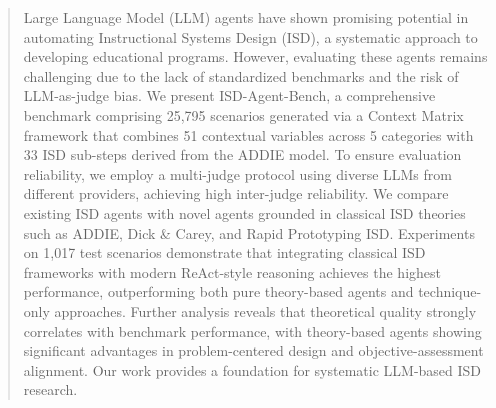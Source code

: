 \begin{abstract}
Large Language Model (LLM) agents have shown promising potential in automating Instructional Systems Design (ISD), a systematic approach to developing educational programs. However, evaluating these agents remains challenging due to the lack of standardized benchmarks and the risk of LLM-as-judge bias. We present ISD-Agent-Bench, a comprehensive benchmark comprising 25,795 scenarios generated via a Context Matrix framework that combines 51 contextual variables across 5 categories with 33 ISD sub-steps derived from the ADDIE model. To ensure evaluation reliability, we employ a multi-judge protocol using diverse LLMs from different providers, achieving high inter-judge reliability. We compare existing ISD agents with novel agents grounded in classical ISD theories such as ADDIE, Dick \& Carey, and Rapid Prototyping ISD. Experiments on 1,017 test scenarios demonstrate that integrating classical ISD frameworks with modern ReAct-style reasoning achieves the highest performance, outperforming both pure theory-based agents and technique-only approaches. Further analysis reveals that theoretical quality strongly correlates with benchmark performance, with theory-based agents showing significant advantages in problem-centered design and objective-assessment alignment. Our work provides a foundation for systematic LLM-based ISD research.
\end{abstract}
